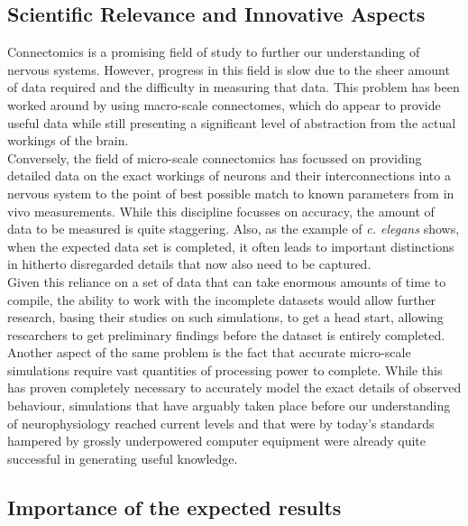 \documentclass[a4paper,11pt]{article}
\begin{document}
\subsection{Scientific Relevance and Innovative Aspects}
Connectomics is a promising field of study to further our understanding of nervous systems. However, progress in this field is slow due to the sheer amount of data required and the difficulty in measuring that data. This problem has been worked around by using macro-scale connectomes, which do appear to provide useful data while still presenting a significant level of abstraction from the actual workings of the brain. 
\\[0,2cm]
Conversely, the field of micro-scale connectomics has focussed on providing detailed data on the exact workings of neurons and their interconnections into a nervous system to the point of best possible match to known parameters from in vivo measurements. While this discipline focusses on accuracy, the amount of data to be measured is quite staggering. Also, as the example of \emph{c. elegans} shows, when the expected data set is completed, it often leads to important distinctions in hitherto disregarded details that now also need to be captured. \\[0,2cm]
Given this reliance on a set of data that can take enormous amounts of time to compile, the ability to work with the incomplete datasets would allow further research, basing their studies on such simulations, to get a head start, allowing researchers to get preliminary findings before the dataset is entirely completed. \\[0,2cm]
Another aspect of the same problem is the fact that accurate micro-scale simulations require vast quantities of processing power to complete. While this has proven  completely necessary to accurately model the exact details of observed behaviour, simulations that have arguably taken place before our understanding of neurophysiology reached current levels and that were by today's standards hampered by grossly underpowered computer equipment were already quite successful in generating useful knowledge. 

\subsection{Importance of the expected results}
\end{document}
